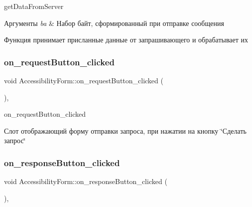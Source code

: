 get\+Data\+From\+Server 


\begin{DoxyParams}{Аргументы}
{\em ba} & Набор байт, сформированный при отправке сообщения\\
\hline
\end{DoxyParams}
Функция принимает присланные данные от запрашивающего и обрабатывает их \mbox{\label{classAccessibilityForm_a47e343e6d2668e2fb9d79c3a4e342bfd}} 
\subsubsection{\texorpdfstring{on\+\_\+request\+Button\+\_\+clicked}{on\_requestButton\_clicked}}
{\footnotesize\ttfamily void Accessibility\+Form\+::on\+\_\+request\+Button\+\_\+clicked (\begin{DoxyParamCaption}{ }\end{DoxyParamCaption})\hspace{0.3cm}{\ttfamily [private]}, {\ttfamily [slot]}}



on\+\_\+request\+Button\+\_\+clicked 

Слот отображающий форму отправки запроса, при нажатии на кнопку \char`\"{}Сделать запрос\char`\"{} \mbox{\label{classAccessibilityForm_aa9ec98dd84724349a77477f0431298dc}} 
\subsubsection{\texorpdfstring{on\+\_\+response\+Button\+\_\+clicked}{on\_responseButton\_clicked}}
{\footnotesize\ttfamily void Accessibility\+Form\+::on\+\_\+response\+Button\+\_\+clicked (\begin{DoxyParamCaption}{ }\end{DoxyParamCaption})\hspace{0.3cm}{\ttfamily [private]}, {\ttfamily [slot]}}



